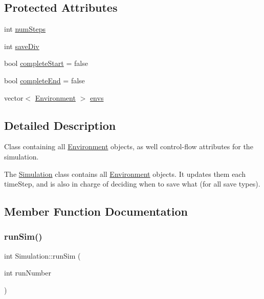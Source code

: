 \subsection*{Protected Attributes}
\begin{DoxyCompactItemize}
\item 
int \hyperlink{classSimulation_a999ce13c1a3d4dca2bf92e346d8b709f}{num\+Steps}
\item 
int \hyperlink{classSimulation_ae8f095e92da49a648954416b351e27c8}{save\+Div}
\item 
bool \hyperlink{classSimulation_a84cd73f44cff4fdbbb40fb98b49f8026}{complete\+Start} = false
\item 
bool \hyperlink{classSimulation_a17bcf189d0f10fa47e4b2dc4b53d4939}{complete\+End} = false
\item 
vector$<$ \hyperlink{classEnvironment}{Environment} $>$ \hyperlink{classSimulation_a29309017ca18043de245ef843b56c533}{envs}
\end{DoxyCompactItemize}


\subsection{Detailed Description}
Class containing all \hyperlink{classEnvironment}{Environment} objects, as well control-\/flow attributes for the simulation. 

The \hyperlink{classSimulation}{Simulation} class contains all \hyperlink{classEnvironment}{Environment} objects. It updates them each time\+Step, and is also in charge of deciding when to save what (for all save types). 

\subsection{Member Function Documentation}
\mbox{\label{classSimulation_a7eb16da89581b496d33b77efbb63b9cd}} 
\subsubsection{\texorpdfstring{run\+Sim()}{runSim()}}
{\footnotesize\ttfamily int Simulation\+::run\+Sim (\begin{DoxyParamCaption}\item[{int}]{run\+Number }\end{DoxyParamCaption})\hspace{0.3cm}{\ttfamily [virtual]}}



